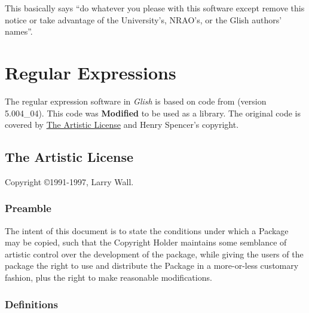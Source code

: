 This basically says ``do whatever you please with this software except
remove this notice or take advantage of the University's, NRAO's, or the
Glish authors' names''.

\section{Regular Expressions}

The regular expression software in {\em Glish} is based on code from
(version 5.004\_04). This code was {\bf\sc Modified} to be used as a
library. The original code is covered by \underline{The Artistic License}
and Henry Spencer's copyright.

\subsection{The Artistic License}
\begin{center}
Copyright \copyright 1991-1997, Larry Wall.
\end{center}

\subsubsection{Preamble}

The intent of this document is to state the conditions under which a
Package may be copied, such that the Copyright Holder maintains some
semblance of artistic control over the development of the package,
while giving the users of the package the right to use and distribute
the Package in a more-or-less customary fashion, plus the right to make
reasonable modifications.

\subsubsection{Definitions}

